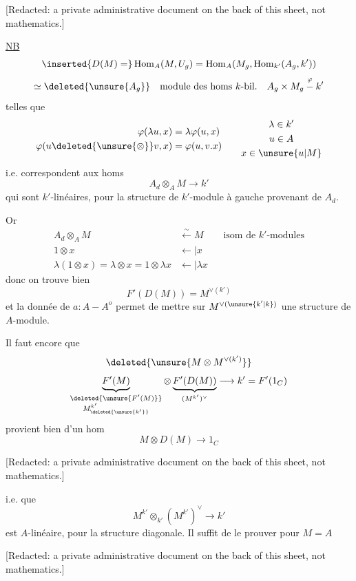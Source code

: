 
[Redacted: a private administrative document on the back of this sheet, not mathematics.]

\uline{NB}
\[
\inserted{D(M)=}
\operatorname{Hom}_A(M,U_g)
=\operatorname{Hom}_A(M_g,\operatorname{Hom}_{k'}(A_g,k'))
\]
\[
\simeq\deleted{\unsure{A_g}}\quad
\text{module des homs }k\text{-bil.}\quad
A_g\times M_g\overset{\varphi}{-}k'
\]
telles que
\[
\begin{aligned}
\varphi(\lambda u,x)&=\lambda\varphi(u,x)\\
\varphi(u\deleted{\unsure{\otimes}}v,x)&=\varphi(u,v.x)
\end{aligned}
\qquad
\begin{gathered}
\lambda\in k'\\u\in A\\x\in\unsure{u|M}
\end{gathered}
\]
i.e. correspondent aux homs
\[
A_d\otimes_A M\longrightarrow k'
\]
qui sont $k'$-linéaires, pour la structure de $k'$-module à gauche
provenant de $A_d$.

Or
\[
\begin{aligned}
A_d\otimes_A M&\xleftarrow{\sim}M
&&\text{isom de }k'\text{-modules}\\
1\otimes x&\mathrel{\longleftarrow\!\vert} x\\
\lambda(1\otimes x)=\lambda\otimes x=1\otimes\lambda x
&\mathrel{\longleftarrow\!\vert}\lambda x
\end{aligned}
\]
donc on trouve bien 
\[
F'(D(M))=M^{\vee(k')}
\]
et la donnée de $a:A-A^o$ permet de mettre sur
$M^{\vee(\unsure{k'|k})}$ une structure de $A$-module.

Il faut encore que
\[
\deleted{\unsure{M\otimes M^{\vee(k')}}}
\]
\[
\underbrace{F'(M)}_{\substack{\deleted{\unsure{F'(M)}}\\
M_{\deleted{\unsure{k'}}}^{k'}}}
\otimes
\underbrace{F'(D(M))}_{(M^{k'})^\vee}
\longrightarrow k'=F'(1_C)
\]
provient bien  d'un hom
\[
M\otimes D(M)\longrightarrow1_C
\]

[Redacted: a private administrative document on the back of this sheet, not mathematics.]

i.e. que
\[
M^{k'}\otimes_{k'}(M^{k'})^\vee\longrightarrow k'
\]
est $A$-linéaire, pour la  structure
diagonale. Il suffit de le prouver pour $M=A$

[Redacted: a private administrative document on the back of this sheet, not mathematics.]

